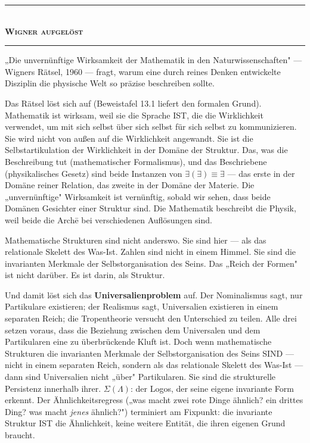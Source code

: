 \documentclass[10pt, openany, oneside]{book}
\renewcommand{\normalsize}{\fontsize{10}{13}\selectfont}
\begin{document}
\begin{center}
    \rule{0.3\textwidth}{0.4pt}\\[0.5em]
    {\normalsize\bfseries\scshape Wigner aufgelöst}\\[0.3em]
    \rule{0.3\textwidth}{0.4pt}
\end{center}

\vspace{1em}

\noindent „Die unvernünftige Wirksamkeit der Mathematik in den Naturwissenschaften" --- Wigners Rätsel, 1960 --- fragt, warum eine durch reines Denken entwickelte Disziplin die physische Welt so präzise beschreiben sollte.

Das Rätsel löst sich auf (Beweistafel 13.1 liefert den formalen Grund). Mathematik ist wirksam, weil sie die Sprache IST, die die Wirklichkeit verwendet, um mit sich selbst über sich selbst für sich selbst zu kommunizieren. Sie wird nicht von außen auf die Wirklichkeit angewandt. Sie ist die Selbstartikulation der Wirklichkeit in der Domäne der Struktur. Das, was die Beschreibung tut (mathematischer Formalismus), und das Beschriebene (physikalisches Gesetz) sind beide Instanzen von $\exists(\exists) \equiv \exists$ --- das erste in der Domäne reiner Relation, das zweite in der Domäne der Materie. Die „unvernünftige" Wirksamkeit ist vernünftig, sobald wir sehen, dass beide Domänen Gesichter einer Struktur sind. Die Mathematik beschreibt die Physik, weil beide die Arch\={e} bei verschiedenen Auflösungen sind.

Mathematische Strukturen sind nicht anderswo. Sie sind hier --- als das relationale Skelett des Was-Ist. Zahlen sind nicht in einem Himmel. Sie sind die invarianten Merkmale der Selbstorganisation des Seins. Das „Reich der Formen" ist nicht darüber. Es ist darin, als Struktur.

Und damit löst sich das \textbf{Universalienproblem} auf. Der Nominalismus sagt, nur Partikulare existieren; der Realismus sagt, Universalien existieren in einem separaten Reich; die Tropentheorie versucht den Unterschied zu teilen. Alle drei setzen voraus, dass die Beziehung zwischen dem Universalen und dem Partikularen eine zu überbrückende Kluft ist. Doch wenn mathematische Strukturen die invarianten Merkmale der Selbstorganisation des Seins SIND --- nicht in einem separaten Reich, sondern als das relationale Skelett des Was-Ist --- dann sind Universalien nicht „über" Partikularen. Sie sind die strukturelle Persistenz innerhalb ihrer. $\Sigma(\Lambda)$: der Logos, der seine eigene invariante Form erkennt. Der Ähnlichkeitsregress („was macht zwei rote Dinge ähnlich? ein drittes Ding? was macht \textit{jenes} ähnlich?") terminiert am Fixpunkt: die invariante Struktur IST die Ähnlichkeit, keine weitere Entität, die ihren eigenen Grund braucht.
\end{document}
